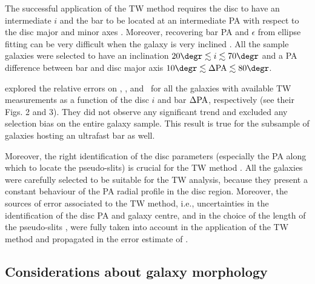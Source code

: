 \documentclass{aa}
\begin{document}
The successful application of the TW method requires the disc to have an intermediate $i$ and the bar to be located at an intermediate PA with respect to the disc major and minor axes \citep{Corsini2011}. Moreover, recovering bar PA and $\epsilon$ from ellipse fitting can be very difficult when the galaxy is very inclined \citep{Comeron2014}. All the sample galaxies were selected to have an inclination $20\degr \lesssim i \lesssim 70 \degr$ and a PA difference between bar and disc major axis $10\degr \lesssim \Delta {\rm PA} \lesssim 80 \degr$. 

\cite{Cuomo2020} explored the relative errors on \omegabar, \rbar, and \rcor\ for all the galaxies with available TW measurements as a function of the disc $i$ and bar $\Delta {\rm PA}$, respectively (see their Figs. 2 and 3). They did not observe any significant trend and excluded any selection bias on the entire galaxy sample. This result is true for the subsample of galaxies hosting an ultrafast bar as well.

Moreover, the right identification of the disc parameters (especially the PA along which to locate the pseudo-slits) is crucial for the TW method \citep{Debattista2003,Zou2019}. All the galaxies were carefully selected to be suitable for the TW analysis, because they present a constant behaviour of the PA radial profile in the disc region. Moreover, the sources of error associated to the TW method, i.e., uncertainties in the identification of the disc PA and galaxy centre, and in the choice of the length of the pseudo-slits \citep{Corsini2011,Garma-Oehmichen2020}, were fully taken into account in the application of the TW method and propagated in the error estimate of \omegabar.

\subsection{Considerations about galaxy morphology}
\end{document}
